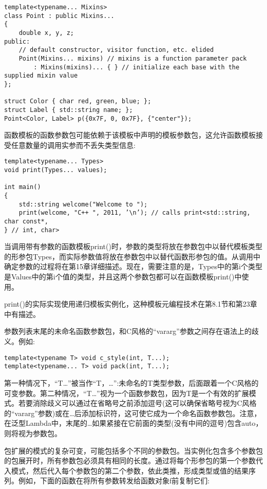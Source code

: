 \begin{lstlisting}[style=styleCXX]
template<typename... Mixins>
class Point : public Mixins...
{
	double x, y, z;
public:
	// default constructor, visitor function, etc. elided
	Point(Mixins... mixins) // mixins is a function parameter pack
		: Mixins(mixins)... { } // initialize each base with the supplied mixin value
};

struct Color { char red, green, blue; };
struct Label { std::string name; };
Point<Color, Label> p({0x7F, 0, 0x7F}, {"center"});
\end{lstlisting}

函数模板的函数参数包可能依赖于该模板中声明的模板参数包，这允许函数模板接受任意数量的调用实参而不丢失类型信息:

\begin{lstlisting}[style=styleCXX]
template<typename... Types>
void print(Types... values);

int main()
{
	std::string welcome("Welcome to ");
	print(welcome, "C++ ", 2011, ’\n’); // calls print<std::string, char const*,
} // int, char>
\end{lstlisting}

当调用带有参数的函数模板print()时，参数的类型将放在参数包中以替代模板类型的形参包Types，而实际参数值将放在参数包中以替代函数形参包的值。从调用中确定参数的过程将在第15章详细描述。现在，需要注意的是，Types中的第i个类型是Values中的第i个值的类型，并且这两个参数包都可以在函数模板print()中使用。

print()的实际实现使用递归模板实例化，这种模板元编程技术在第8.1节和第23章中有描述。

参数列表末尾的未命名函数参数包，和C风格的“vararg”参数之间存在语法上的歧义。例如:

\begin{lstlisting}[style=styleCXX]
template<typename T> void c_style(int, T...);
template<typename... T> void pack(int, T...);
\end{lstlisting}

第一种情况下，“T…”被当作“T，…”:未命名的T类型参数，后面跟着一个C风格的可变参数。第二种情况，“T…”视为一个函数参数包，因为T是一个有效的扩展模式。若要消除歧义可以通过在省略号之前添加逗号(这可以确保省略号视为C风格的“vararg”参数)或在…后添加标识符，这可使它成为一个命名函数参数包。注意，在泛型Lambda中，末尾的…如果紧接在它前面的类型(没有中间的逗号)包含auto，则将视为参数包。


包扩展的模式的复杂可变，可能包括多个不同的参数包。当实例化包含多个参数包的包展开时，所有参数包必须具有相同的长度。通过将每个形参包的第一个参数代入模式，然后代入每个参数包的第二个参数，依此类推，形成类型或值的结果序列。例如，下面的函数在将所有参数转发给函数对象f前复制它们:

